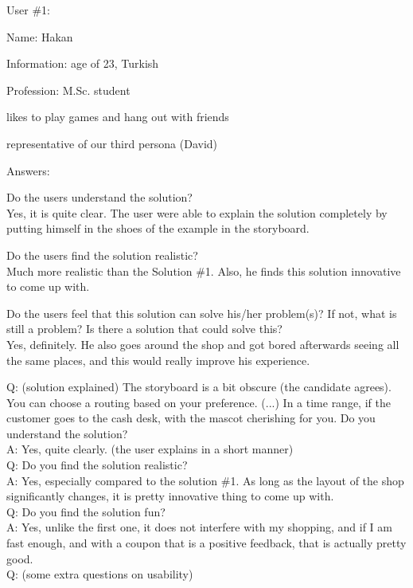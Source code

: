 \documentclass[a4paper,10pt,oneside]{scrreprt}
\begin{document}
User \#1:
\begin{compactitem}
	\item Name: Hakan
	\item Information: age of 23, Turkish
	\item Profession: M.Sc. student
	\item likes to  play games and hang out with friends
	\item representative of our third persona (David)
\end{compactitem}
\bigskip

Answers:
\begin{compactitem}
	\item Do the users understand the solution?\\
	Yes, it is quite clear. The user were able to explain the solution completely by putting himself in the shoes of the example in the storyboard.\\
	
	\item Do the users find the solution realistic?\\
	Much more realistic than the Solution \#1. Also, he finds this solution innovative to come up with.\\
	
	\item Do the users feel that this solution can solve his/her problem(s)? If not, what is still
	a problem? Is there a solution that could solve this?\\
	Yes, definitely. He also goes around the shop and got bored afterwards seeing all the same places, and this would really improve his experience.\\
\end{compactitem}
\bigskip

\noindent Q: (solution explained) The storyboard is a bit obscure (the candidate agrees). You can choose a routing based on your preference. (...) In a time range, if the customer goes to the cash desk, with the mascot cherishing for you. Do you understand the solution?\\
A: Yes, quite clearly. (the user explains in a short manner)\\
Q: Do you find the solution realistic?\\
A: Yes, especially compared to the solution \#1. As long as the layout of the shop significantly changes, it is pretty innovative thing to come up with.\\
Q: Do you find the solution fun?\\
A: Yes, unlike the first one, it does not interfere with my shopping, and if I am fast enough, and with a coupon that is a positive feedback, that is actually pretty good.\\
Q: (some extra questions on usability)
\end{document}
